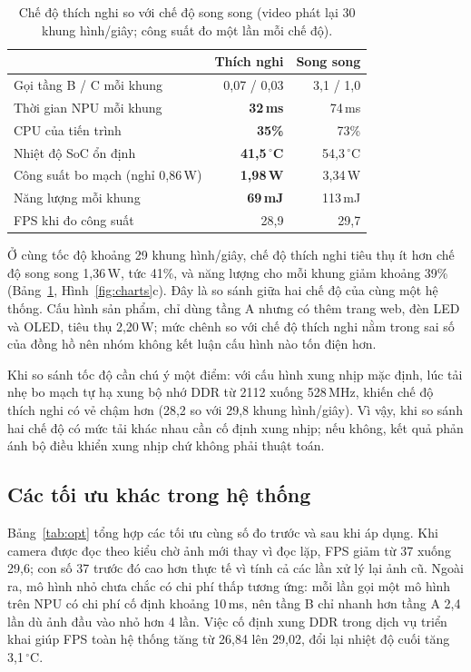 \documentclass[11pt,a4paper,twocolumn]{article}
\begin{document}
\begin{table}[t]
\centering
\caption{Chế độ thích nghi so với chế độ song song (video phát lại 30 khung hình/giây; công suất đo một lần mỗi chế độ).}
\label{tab:adapt}
\footnotesize
\begin{tabular}{@{}lrr@{}}
\toprule
 & Thích nghi & Song song \\
\midrule
Gọi tầng B / C mỗi khung & 0,07 / 0,03 & 3,1 / 1,0 \\
Thời gian NPU mỗi khung & \textbf{32\,ms} & 74\,ms \\
CPU của tiến trình & \textbf{35\%} & 73\% \\
Nhiệt độ SoC ổn định & \textbf{41,5\,$^\circ$C} & 54,3\,$^\circ$C \\
Công suất bo mạch (nghỉ 0,86\,W) & \textbf{1,98\,W} & 3,34\,W \\
Năng lượng mỗi khung & \textbf{69\,mJ} & 113\,mJ \\
FPS khi đo công suất & 28,9 & 29,7 \\
\bottomrule
\end{tabular}
\end{table}

Ở cùng tốc độ khoảng 29 khung hình/giây, chế độ thích nghi tiêu thụ ít hơn chế độ song song 1,36\,W, tức 41\%, và năng lượng cho mỗi khung giảm khoảng 39\% (Bảng~\ref{tab:adapt},
Hình~\ref{fig:charts}c). Đây là so sánh giữa hai chế độ của cùng một hệ thống. Cấu hình sản phẩm, chỉ dùng tầng A nhưng có thêm trang web, đèn LED và OLED, tiêu thụ 2,20\,W; mức chênh so với
chế độ thích nghi nằm trong sai số của đồng hồ nên nhóm không kết luận cấu hình nào tốn điện hơn.

Khi so sánh tốc độ cần chú ý một điểm: với cấu hình xung nhịp mặc định, lúc tải nhẹ bo mạch tự hạ xung bộ nhớ DDR từ 2112 xuống 528\,MHz, khiến chế độ thích nghi có vẻ chậm hơn
(28,2 so với 29,8 khung hình/giây). Vì vậy, khi so sánh hai chế độ có mức tải khác nhau cần cố định xung nhịp; nếu không, kết quả phản ánh bộ điều khiển xung nhịp chứ không phải thuật toán.

\subsection{Các tối ưu khác trong hệ thống}

Bảng~\ref{tab:opt} tổng hợp các tối ưu cùng số đo trước và sau khi áp dụng. Khi camera được đọc theo kiểu chờ ảnh mới thay vì đọc lặp, FPS giảm từ 37 xuống 29,6; con số 37 trước đó cao hơn
thực tế vì tính cả các lần xử lý lại ảnh cũ. Ngoài ra, mô hình nhỏ chưa chắc có chi phí thấp tương ứng: mỗi lần gọi một mô hình trên NPU có chi phí cố định khoảng 10\,ms, nên tầng B chỉ nhanh hơn
tầng A 2,4 lần dù ảnh đầu vào nhỏ hơn 4 lần. Việc cố định xung DDR trong dịch vụ triển khai giúp FPS toàn hệ thống tăng từ 26,84 lên 29,02, đổi lại nhiệt độ cuối tăng 3,1\,$^\circ$C.
\end{document}
